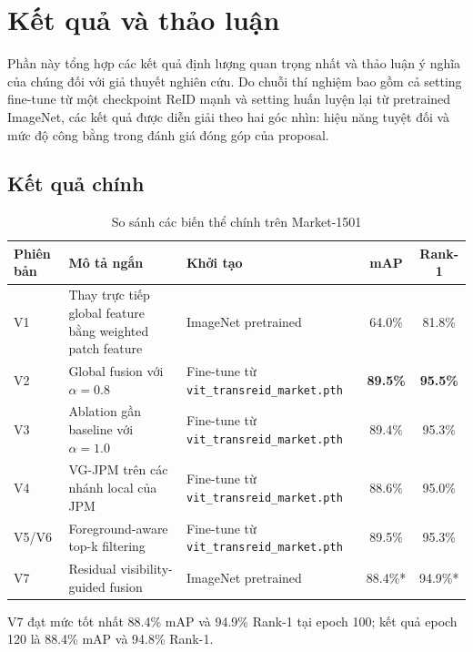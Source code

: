 \section{Kết quả và thảo luận}

Phần này tổng hợp các kết quả định lượng quan trọng nhất và thảo luận ý nghĩa của chúng đối với giả thuyết nghiên cứu. Do chuỗi thí nghiệm bao gồm cả setting fine-tune từ một checkpoint ReID mạnh và setting huấn luyện lại từ pretrained ImageNet, các kết quả được diễn giải theo hai góc nhìn: hiệu năng tuyệt đối và mức độ công bằng trong đánh giá đóng góp của proposal.

\subsection{Kết quả chính}

\begin{table}[!t]
    \centering
    \begin{tabular}{p{1.1cm} p{4.8cm} p{3.6cm} c c}
        \hline
        Phiên bản & Mô tả ngắn & Khởi tạo & mAP & Rank-1 \\
        \hline
        V1 & Thay trực tiếp global feature bằng weighted patch feature & ImageNet pretrained & 64.0\% & 81.8\% \\
        V2 & Global fusion với \(\alpha = 0.8\) & Fine-tune từ \texttt{vit\_transreid\_market.pth} & \textbf{89.5\%} & \textbf{95.5\%} \\
        V3 & Ablation gần baseline với \(\alpha = 1.0\) & Fine-tune từ \texttt{vit\_transreid\_market.pth} & 89.4\% & 95.3\% \\
        V4 & VG-JPM trên các nhánh local của JPM & Fine-tune từ \texttt{vit\_transreid\_market.pth} & 88.6\% & 95.0\% \\
        V5/V6 & Foreground-aware top-k filtering & Fine-tune từ \texttt{vit\_transreid\_market.pth} & 89.5\% & 95.3\% \\
        V7 & Residual visibility-guided fusion & ImageNet pretrained & 88.4\%* & 94.9\%* \\
        \hline
    \end{tabular}

    \vspace{4pt}

    \caption{So sánh các biến thể chính trên Market-1501}
    \label{tab:main_results}

    {\footnotesize * V7 đạt mức tốt nhất 88.4\% mAP và 94.9\% Rank-1 tại epoch 100; kết quả epoch 120 là 88.4\% mAP và 94.8\% Rank-1.}
\end{table}

